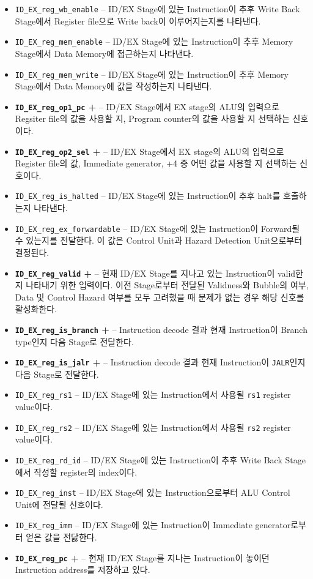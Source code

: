 \documentclass{scrartcl}
\begin{document}
\begin{itemize}
  \item \texttt{ID\_EX\_reg\_wb\_enable} -- ID/EX Stage에 있는 Instruction이 추후 Write Back Stage에서 Register file으로 Write back이 이루어지는지를 나타낸다.
  \item \texttt{ID\_EX\_reg\_mem\_enable} -- ID/EX Stage에 있는 Instruction이 추후 Memory Stage에서 Data Memory에 접근하는지 나타낸다.
  \item \texttt{ID\_EX\_reg\_mem\_write} -- ID/EX Stage에 있는 Instruction이 추후 Memory Stage에서 Data Memory에 값을 작성하는지 나타낸다.
  \item \textbf{\texttt{ID\_EX\_reg\_op1\_pc} +} -- ID/EX Stage에서 EX stage의 ALU의 입력으로 Regsiter file의 값을 사용할 지, Program counter의 값을 사용할 지 선택하는 신호이다.
  \item \textbf{\texttt{ID\_EX\_reg\_op2\_sel} +} -- ID/EX Stage에서 EX stage의 ALU의 입력으로 Register file의 값, Immediate generator, +4 중 어떤 값을 사용할 지 선택하는 신호이다.
  \item \texttt{ID\_EX\_reg\_is\_halted} -- ID/EX Stage에 있는 Instruction이 추후 halt를 호출하는지 나타낸다.
  \item \texttt{ID\_EX\_reg\_ex\_forwardable} -- ID/EX Stage에 있는 Instruction이 Forward될 수 있는지를 전달한다. 이 값은 Control Unit과 Hazard Detection Unit으로부터 결정된다.
  \item \textbf{\texttt{ID\_EX\_reg\_valid} +} -- 현재 ID/EX Stage를 지나고 있는 Instruction이 valid한지 나타내기 위한 입력이다. 이전 Stage로부터 전달된 Validness와 Bubble의 여부, Data 및 Control Hazard 여부를 모두 고려했을 때 문제가 없는 경우 해당 신호를 활성화한다.
  \item \textbf{\texttt{ID\_EX\_reg\_is\_branch} +} -- Instruction decode 결과 현재 Instruction이 Branch type인지 다음 Stage로 전달한다.
  \item \textbf{\texttt{ID\_EX\_reg\_is\_jalr} +} -- Instruction decode 결과 현재 Instruction이 \texttt{JALR}인지 다음 Stage로 전달한다.
  \item \texttt{ID\_EX\_reg\_rs1} -- ID/EX Stage에 있는 Instruction에서 사용될 \texttt{rs1} register value이다.
  \item \texttt{ID\_EX\_reg\_rs2} -- ID/EX Stage에 있는 Instruction에서 사용될 \texttt{rs2} register value이다.
  \item \texttt{ID\_EX\_reg\_rd\_id} -- ID/EX Stage에 있는 Instruction이 추후 Write Back Stage에서 작성할 register의 index이다.
  \item \texttt{ID\_EX\_reg\_inst} -- ID/EX Stage에 있는 Instruction으로부터 ALU Control Unit에 전달될 신호이다.
  \item \texttt{ID\_EX\_reg\_imm} -- ID/EX Stage에 있는 Instruction이 Immediate generator로부터 얻은 값을 전닳한다.
  \item \textbf{\texttt{ID\_EX\_reg\_pc} +} -- 현재 ID/EX Stage를 지나는 Instruction이 놓이던 Instruction address를 저장하고 있다.
\end{itemize}
\end{document}
